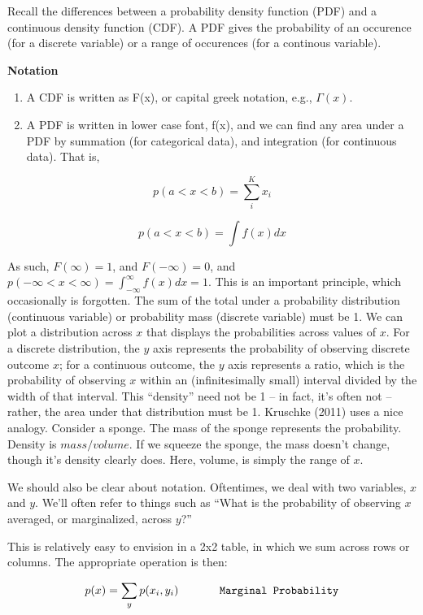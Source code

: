 \documentclass[
]{book}
\begin{document}
Recall the differences between a probability density function (PDF) and a continuous density function (CDF). A PDF gives the probability of an occurence (for a discrete variable) or a range of occurences (for a continous variable).

\textbf{Notation}

\begin{enumerate}
\def\labelenumi{(\arabic{enumi})}
\item
  A CDF is written as F(x), or capital greek notation, e.g., \(\Gamma(x)\).
\item
  A PDF is written in lower case font, f(x), and we can find any area under a PDF by summation (for categorical data), and integration (for continuous data). That is,
\end{enumerate}

\[p(a<x<b)=\sum_i^{K} x_i\]

\[p(a<x<b)=\int f(x) dx\]

As such, \(F(\infty)=1\), and \(F(-\infty)=0\), and \(p(-\infty < x < \infty)=\int_{-\infty}^{\infty}f(x)dx=1\). This is an important principle, which occasionally is forgotten. The sum of the total under a probability distribution (continuous variable) or probability mass (discrete variable) must be 1. We can plot a distribution across \(x\) that displays the probabilities across values of \(x\). For a discrete distribution, the \(y\) axis represents the probability of observing discrete outcome \(x\); for a continuous outcome, the \(y\) axis represents a ratio, which is the probability of observing \(x\) within an (infinitesimally small) interval divided by the width of that interval. This ``density'' need not be 1 -- in fact, it's often not -- rather, the area under that distribution must be 1. Kruschke (2011) uses a nice analogy. Consider a sponge. The mass of the sponge represents the probability. Density is \(mass/volume\). If we squeeze the sponge, the mass doesn't change, though it's density clearly does. Here, volume, is simply the range of \(x\).

We should also be clear about notation. Oftentimes, we deal with two variables, \(x\) and \(y\). We'll often refer to things such as ``What is the probability of observing \(x\) averaged, or marginalized, across \(y\)?''

This is relatively easy to envision in a 2x2 table, in which we sum across rows or columns. The appropriate operation is then:

\[p(x)=\sum_y p(x_i, y_i) \hspace{0.5in}  \texttt{Marginal Probability}\]
\end{document}
